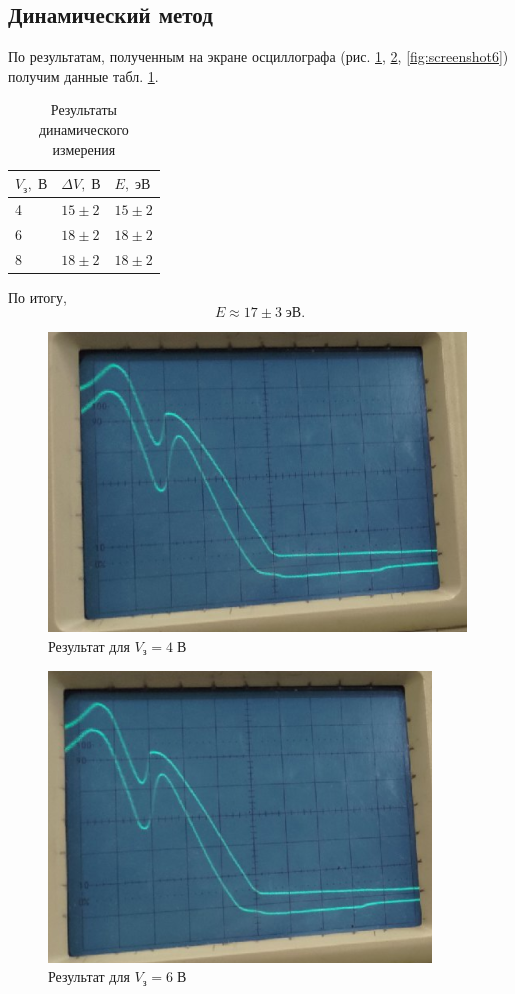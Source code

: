 \documentclass[a4paper]{article}
\begin{document}
\subsection{Динамический метод}

По результатам, полученным на экране осциллографа (рис. \ref{fig:screenshot4}, \ref{fig:screenshot5}, \ref{fig:screenshot6}) получим данные табл. \ref{tab:1}.

 \begin{table}[h]
 	\centering
 	\begin{tabular}{|l|l|l|}
 		\hline
 		$V_з, \;В$ & $\Delta V, \; В$ & $E,\; эВ$ \\ \hline
 		4          & $15\pm 2$               & $15\pm 2$        \\ \hline
 		6          & $18\pm 2$               & $18\pm 2$        \\ \hline
 		8          & $18\pm 2$               & $18\pm 2$        \\ \hline
 	\end{tabular}
 \label{tab:1}
 \caption{Результаты динамического измерения}
 \end{table}

По итогу,
\begin{equation}\label{key}
	E \approx 17 \pm 3 \; эВ.
\end{equation}

\begin{figure}[tbh]
	\centering
	\includegraphics[width=0.7\linewidth]{Screenshot_4}
	\caption{Результат для $V_з = 4 \;В$}
	\label{fig:screenshot4}
\end{figure}

\begin{figure}[tbh]
	\centering
	\includegraphics[width=0.7\linewidth]{Screenshot_5}
	\caption{Результат для $V_з = 6\; В$}
	\label{fig:screenshot5}
\end{figure}
\end{document}
